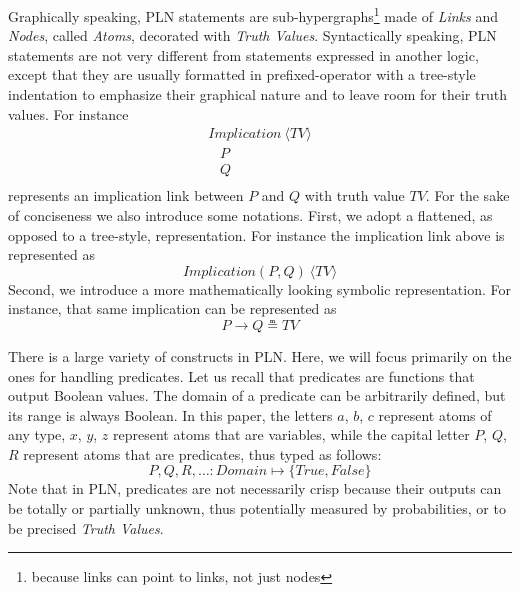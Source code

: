 \documentclass[runningheads]{llncs}
\newcommand{\SP}{\;\;\;}
\newcommand{\TTrue}{\textit{True}}
\newcommand{\TFalse}{\textit{False}}
\newcommand{\TAtom}{\textit{Atom}}
\newcommand{\TImpl}{\textit{Implication}}
\newcommand{\TTV}{\textit{TV}}
\newcommand{\TBTV}{\langle \TTV \rangle}
\newcommand{\limp}{\rightarrow}
\begin{document}

Graphically speaking, PLN statements are
sub-hypergraphs\footnote{because links can point to links, not just
  nodes} made of \emph{Links} and \emph{Nodes}, called \emph{Atoms},
decorated with \emph{Truth Values}.  Syntactically speaking, PLN
statements are not very different from statements expressed in another
logic, except that they are usually formatted in prefixed-operator
with a tree-style indentation to emphasize their graphical nature and
to leave room for their truth values.  For instance
$$
\begin{array}{l}
  \TImpl\ \TBTV\\
  \SP P\\
  \SP Q\\
\end{array}
$$
represents an implication link between $P$ and $Q$ with truth value
$\TTV$.  For the sake of conciseness we also introduce some notations.
First, we adopt a flattened, as opposed to a tree-style,
representation.  For instance the implication link above is
represented as
$$\TImpl(P, Q)\ \TBTV$$
Second, we introduce a more mathematically looking symbolic
representation.  For instance, that same implication can be
represented as
$$P \limp Q \measeq \TTV$$

There is a large variety of constructs in PLN.  Here, we will focus
primarily on the ones for handling predicates.  Let us recall that
predicates are functions that output Boolean values.  The domain of a
predicate can be arbitrarily defined, but its range is always Boolean.
In this paper, the letters $a$, $b$, $c$ represent atoms of
any type, $x$, $y$, $z$ represent atoms that are variables, while the
capital letter $P$, $Q$, $R$ represent atoms that are predicates, thus
typed as follows:
$$P, Q, R, \hdots: \textit{Domain} \mapsto \{\TTrue, \TFalse\}$$
Note that in PLN, predicates are not necessarily crisp because their
outputs can be totally or partially unknown, thus potentially measured
by probabilities, or to be precised \emph{Truth Values}.
\end{document}
